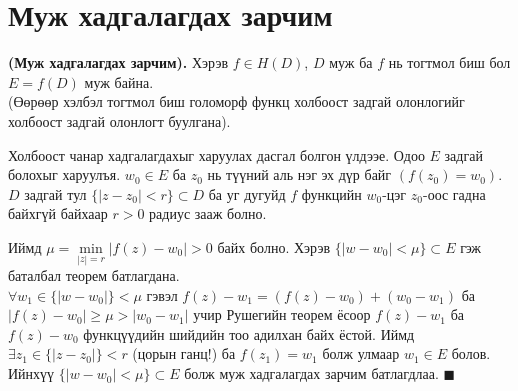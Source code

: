 \section{Муж хадгалагдах зарчим} 
\begin{thm}
\textbf{(Муж хадгалагдах зарчим).} Хэрэв $f\in H(D)$, $D$ муж ба $f$ нь тогтмол биш бол $E=f(D)$ муж байна.\\
(Өөрөөр хэлбэл тогтмол биш голоморф функц холбоост задгай олонлогийг холбоост задгай олонлогт буулгана).
\end{thm}
\begin{prf}
Холбоост чанар хадгалагдахыг харуулах дасгал болгон үлдээе. Одоо $E$ задгай болохыг харуулъя. $w_0\in E$ ба $z_0$ нь түүний аль нэг эх дүр байг $(f(z_0)=w_0)$.\\
$D$ задгай тул $\{|z-z_0|<r\}\subset D$ ба уг дугуйд $f$ функцийн $w_0$-цэг $z_0$-оос гадна байхгүй байхаар $r>0$ радиус зааж болно. 

Иймд $\mu =\min\limits_{|z|=r}|f(z)-w_0|>0$ байх болно. Хэрэв $\{|w-w_0|<\mu \}\subset E$  гэж баталбал теорем батлагдана. \\
$\forall w_1\in \{|w-w_0|\}<\mu$ гэвэл $f(z)-w_1=(f(z)-w_0)+(w_0-w_1)$ ба $|f(z)-w_0|\geq \mu>|w_0-w_1|$ учир Рушегийн теорем ёсоор $f(z)-w_1$ ба $f(z)-w_0$ функцүүдийн шийдийн тоо адилхан байх ёстой. Иймд $\exists z_1\in \{|z-z_0|\}<r$ (цорын ганц!) ба $f(z_1)=w_1$ болж улмаар $w_1\in E$ болов. Ийнхүү $\{|w-w_0|<\mu \}\subset E$ болж муж хадгалагдах зарчим батлагдлаа.
\hfill $\blacksquare$\end{prf}
